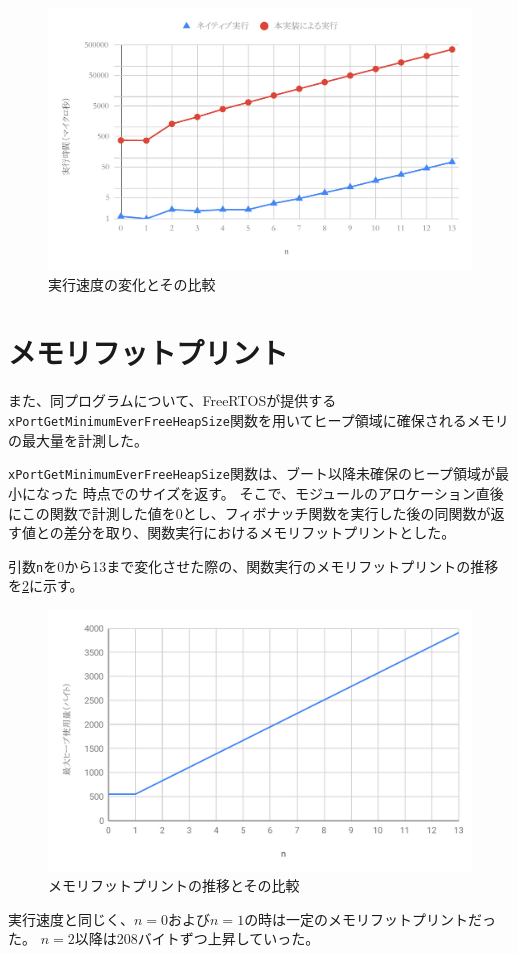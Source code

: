 \begin{figure}[htbp]
  \caption{実行速度の変化とその比較}
  \label{fig:exec_time}
  \begin{center}
    \includegraphics[bb=0 0 600 370,width=12cm]{img/fib_time.pdf}
  \end{center}
\end{figure}

\section{メモリフットプリント}

また、同プログラムについて、FreeRTOSが提供する\verb|xPortGetMinimumEverFreeHeapSize|関数を用いてヒープ領域に確保されるメモリの最大量を計測した。

\verb|xPortGetMinimumEverFreeHeapSize|関数は、ブート以降未確保のヒープ領域が最小になった
時点でのサイズを返す。
そこで、モジュールのアロケーション直後にこの関数で計測した値を0とし、フィボナッチ関数を実行した後の同関数が返す値との差分を取り、関数実行におけるメモリフットプリントとした。

引数\verb|n|を0から13まで変化させた際の、関数実行のメモリフットプリントの推移を\ref{fig:heap_size}に示す。

\begin{figure}[htbp]
  \caption{メモリフットプリントの推移とその比較}
  \label{fig:heap_size}
  \begin{center}
    \includegraphics[bb=0 0 600 370,width=12cm]{img/heap_size.pdf}
  \end{center}
\end{figure}

実行速度と同じく、$n=0$および$n=1$の時は一定のメモリフットプリントだった。
$n=2$以降は208バイトずつ上昇していった。
